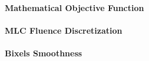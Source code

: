 \paragraph{Mathematical Objective Function}

\paragraph{MLC Fluence Discretization}

\paragraph{Bixels Smoothness}

